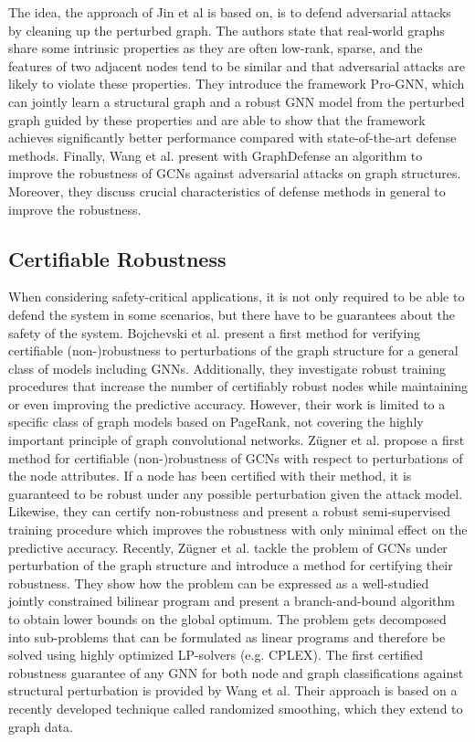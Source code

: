 \documentclass[a4paper,preprint]{sig-alternate}
\begin{document}
The idea, the approach of Jin et al \cite{jin2020graph} is based on, is to defend adversarial attacks by cleaning up the perturbed graph.
The authors state that real-world graphs share some intrinsic properties as they are often low-rank, sparse, and the features of two adjacent
nodes tend to be similar and that adversarial attacks are likely to violate these properties.
They introduce the framework Pro-GNN, which can jointly learn a structural graph and a robust GNN model from the perturbed graph guided by
these properties and are able to show that the framework achieves significantly better performance compared with state-of-the-art 
defense methods.
Finally, Wang et al. \cite{wang2019graphdefense} present with GraphDefense an algorithm to improve the robustness of GCNs
against adversarial attacks on graph structures. Moreover, they discuss crucial characteristics of defense methods in general to improve 
the robustness.

\subsection{Certifiable Robustness}
\label{sec:rev3}

When considering safety-critical applications, it is not only required to be able to defend the system in some scenarios, but there
have to be guarantees about the safety of the system.
Bojchevski et al. \cite{bojchevski2019certifiable} present a first method for verifying certifiable
(non-)robustness to perturbations of the graph structure for a general class of models including GNNs. Additionally, they investigate robust 
training procedures that increase the number of certifiably robust nodes while maintaining or even improving the predictive accuracy.
However, their work is limited to a specific class of graph models based on PageRank, not covering the highly important principle of graph convolutional
networks. \cite{10.1145/3394486.3403217}
Zügner et al. \cite{Z_gner_2019} propose a first method for certifiable (non-)robustness of GCNs with respect to 
perturbations of the node attributes. If a node has been certified with their method, it is guaranteed to be robust under any
possible perturbation given the attack model. Likewise, they can certify non-robustness and present a robust semi-supervised training
procedure which improves the robustness with only minimal effect on the predictive accuracy.
Recently, Zügner et al. \cite{10.1145/3394486.3403217} tackle the problem of GCNs under perturbation of the graph structure and introduce a method
for certifying their robustness. They show how the problem can be expressed as a well-studied jointly constrained bilinear program and
present a branch-and-bound algorithm to obtain lower bounds on the global optimum. The problem gets decomposed into sub-problems that can
be formulated as linear programs and therefore be solved using highly optimized LP-solvers (e.g. CPLEX).
The first certified robustness guarantee of any GNN for both node and graph classifications against structural perturbation
is provided by Wang et al.\cite{wang2020certified} Their approach is based on a recently developed technique called randomized smoothing,
which they extend to graph data.
\end{document}
